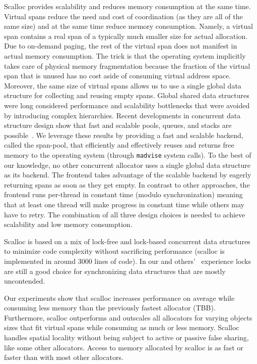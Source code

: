 \documentclass[10pt]{sigplanconf}
\newcommand{\impl}[1]{{\tt #1}\xspace}
\begin{document}
Scalloc provides scalability and reduces memory consumption at the same time. Virtual spans reduce the need and cost of coordination (as they are all of the same size) and at the same time reduce memory consumption. Namely, a virtual span contains a real span of a typically much smaller size for actual allocation. Due to on-demand paging, the rest of the virtual span does not manifest in actual memory consumption. The trick is that the operating system implicitly takes care of physical memory fragmentation because the fraction of the virtual span that is unused has no cost aside of consuming virtual address space. Moreover, the same size of virtual spans allows us to use a single global data structure for collecting and reusing empty spans. Global shared data structures were long considered performance and scalability bottlenecks that were avoided by introducing complex hierarchies. Recent developments in concurrent data structure design show that fast and scalable pools, queues, and stacks are possible~\cite{Henzinger:POPL13,Haas:CF13,Afek:OPODIS10}. We leverage these results by providing a fast and scalable backend, called the span-pool, that efficiently and effectively reuses and returns free memory to the operating system (through \impl{madvise} system calls). To the best of our knowledge, no other concurrent allocator uses a single global data structure as its backend. The frontend takes advantage of the scalable backend by eagerly returning spans as soon as they get empty. In contrast to other approaches, the frontend runs per-thread in constant time (modulo synchronization) meaning that at least one thread will make progress in constant time while others may have to retry. The combination of all three design choices is needed to achieve scalability and low memory consumption.

Scalloc is based on a mix of lock-free and lock-based concurrent data structures to minimize code complexity without sacrificing performance (scalloc is implemented in around 3000 lines of code). In our and others'~\cite{Hendler:SPAA10} experience locks are still a good choice for synchronizing data structures that are mostly uncontended.

Our experiments show that scalloc increases performance on average while consuming 
less memory than the previously fastest allocator (TBB).
Furthermore, scalloc outperforms and outscales all allocators for varying objects sizes that fit virtual spans while consuming as much or less memory. Scalloc handles spatial locality without being subject to active or passive false sharing, like some other allocators. Access to memory allocated by scalloc is as fast or faster than with most other allocators.
\end{document}
